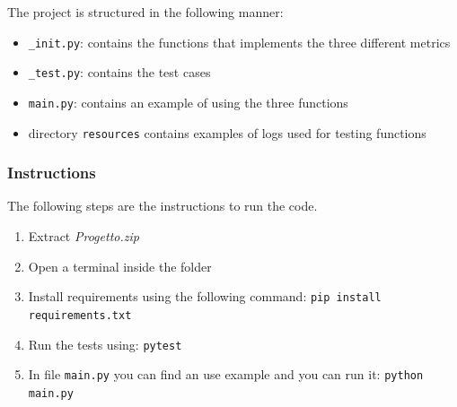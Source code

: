 \documentclass[12pt]{article}
\begin{document}
The project is structured in the following manner:
\begin{itemize}
	\item \texttt{\_init.py}: contains the functions that implements the three different metrics
	\item \texttt{\_test.py}: contains the test cases
	\item \texttt{main.py}: contains an example of using the three functions
	\item directory \texttt{resources} contains examples of logs used for testing functions
		
\end{itemize}

\subsubsection*{Instructions}

The following steps are the instructions to run the code.
\begin{enumerate}
	\item Extract \textit{Progetto.zip}
	\item Open a terminal inside the folder
	\item Install requirements using the following command: \texttt{pip install requirements.txt}
	\item Run the tests using: \texttt{pytest}
	\item In file \texttt{main.py} you can find an use example and you can run it: \texttt{python main.py}
\end{enumerate}

 

\end{document}
